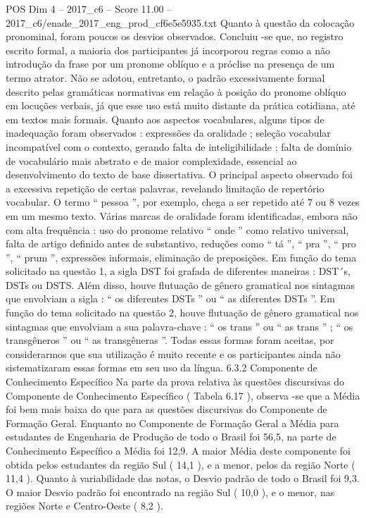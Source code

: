 \begin{textsample}{POS Dim 4 – 2017\_c6 – Score 11.00 – 2017\_c6/enade\_2017\_eng\_prod\_cf6e5e5935.txt}
Quanto à questão da colocação pronominal, foram poucos os desvios observados.
Concluiu -se que, no registro escrito formal, a maioria dos participantes já incorporou regras como a não introdução da frase por um pronome oblíquo e a próclise na presença de um termo atrator.
Não se adotou, entretanto, o padrão excessivamente formal descrito pelas gramáticas normativas em relação à posição do pronome oblíquo em locuções verbais, já que esse uso está muito distante da prática cotidiana, até em textos mais formais.
Quanto aos aspectos vocabulares, alguns tipos de inadequação foram observados : expressões da oralidade ; seleção vocabular incompatível com o contexto, gerando falta de inteligibilidade ; falta de domínio de vocabulário mais abstrato e de maior complexidade, essencial ao desenvolvimento do texto de base dissertativa.
O principal aspecto observado foi a excessiva repetição de certas palavras, revelando limitação de repertório vocabular.
O termo “ pessoa ”, por exemplo, chega a ser repetido até 7 ou 8 vezes em um mesmo texto.
Várias marcas de oralidade foram identificadas, embora não com alta frequência : uso do pronome relativo “ onde ” como relativo universal, falta de artigo definido antes de substantivo, reduções como “ tá ”, “ pra ”, “ pro ”, “ prum ”, expressões informais, eliminação de preposições.
Em função do tema solicitado na questão 1, a sigla DST foi grafada de diferentes maneiras : DST´s, DSTs ou DSTS.
Além disso, houve flutuação de gênero gramatical nos sintagmas que envolviam a sigla : “ os diferentes DSTs ” ou “ as diferentes DSTs ”.
Em função do tema solicitado na questão 2, houve flutuação de gênero gramatical nos sintagmas que envolviam a sua palavra-chave : “ os trans ” ou “ as trans ” ; “ os transgêneros ” ou “ as transgêneras ”.
Todas essas formas foram aceitas, por considerarmos que sua utilização é muito recente e os participantes ainda não sistematizaram essas formas em seu uso da língua. 6.3.2 Componente de Conhecimento Específico Na parte da prova relativa às questões discursivas do Componente de Conhecimento Específico ( Tabela 6.17 ), observa -se que a Média foi bem mais baixa do que para as questões discursivas do Componente de Formação Geral.
Enquanto no Componente de Formação Geral a Média para estudantes de Engenharia de Produção de todo o Brasil foi 56,5, na parte de Conhecimento Específico a Média foi 12,9.
A maior Média deste componente foi obtida pelos estudantes da região Sul ( 14,1 ), e a menor, pelos da região Norte ( 11,4 ).
Quanto à variabilidade das notas, o Desvio padrão de todo o Brasil foi 9,3.
O maior Desvio padrão foi encontrado na região Sul ( 10,0 ), e o menor, nas regiões Norte e Centro-Oeste ( 8,2 ).

\end{textsample}
